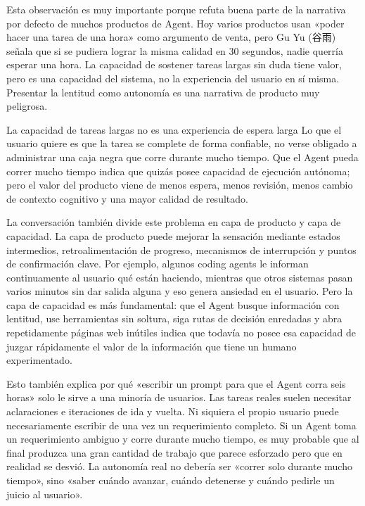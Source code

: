 \documentclass[a4paper]{article}
\begin{document}
Esta observación es muy importante porque refuta buena parte de la narrativa por defecto de muchos productos de Agent. Hoy varios productos usan «poder hacer una tarea de una hora» como argumento de venta, pero Gu Yu (谷雨) señala que si se pudiera lograr la misma calidad en 30 segundos, nadie querría esperar una hora. La capacidad de sostener tareas largas sin duda tiene valor, pero es una capacidad del sistema, no la experiencia del usuario en sí misma. Presentar la lentitud como autonomía es una narrativa de producto muy peligrosa.

\begin{importantbox}{La capacidad de tareas largas no es una experiencia de espera larga}
Lo que el usuario quiere es que la tarea se complete de forma confiable, no verse obligado a administrar una caja negra que corre durante mucho tiempo. Que el Agent pueda correr mucho tiempo indica que quizás posee capacidad de ejecución autónoma; pero el valor del producto viene de menos espera, menos revisión, menos cambio de contexto cognitivo y una mayor calidad de resultado.
\end{importantbox}

La conversación también divide este problema en capa de producto y capa de capacidad. La capa de producto puede mejorar la sensación mediante estados intermedios, retroalimentación de progreso, mecanismos de interrupción y puntos de confirmación clave. Por ejemplo, algunos coding agents le informan continuamente al usuario qué están haciendo, mientras que otros sistemas pasan varios minutos sin dar salida alguna y eso genera ansiedad en el usuario. Pero la capa de capacidad es más fundamental: que el Agent busque información con lentitud, use herramientas sin soltura, siga rutas de decisión enredadas y abra repetidamente páginas web inútiles indica que todavía no posee esa capacidad de juzgar rápidamente el valor de la información que tiene un humano experimentado.

Esto también explica por qué «escribir un prompt para que el Agent corra seis horas» solo le sirve a una minoría de usuarios. Las tareas reales suelen necesitar aclaraciones e iteraciones de ida y vuelta. Ni siquiera el propio usuario puede necesariamente escribir de una vez un requerimiento completo. Si un Agent toma un requerimiento ambiguo y corre durante mucho tiempo, es muy probable que al final produzca una gran cantidad de trabajo que parece esforzado pero que en realidad se desvió. La autonomía real no debería ser «correr solo durante mucho tiempo», sino «saber cuándo avanzar, cuándo detenerse y cuándo pedirle un juicio al usuario».
\end{document}
